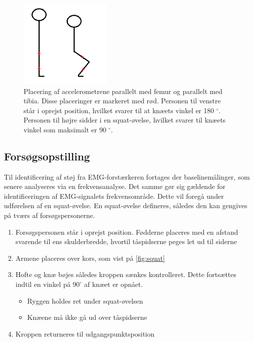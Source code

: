 \begin{figure}[H]
\centering
\includegraphics[width=0.4\textwidth]{figures/accelerometervinkel.png}
\caption{Placering af accelerometrene parallelt med femur og parallelt med tibia. Disse placeringer er markeret med rød. Personen til venstre står i oprejst position, hvilket svarer til at knæets vinkel er 180 $^{\circ}$. Personen til højre sidder i en squat-øvelse, hvilket svarer til knæets vinkel som maksimalt er 90 $^{\circ}$.}
\label{fig:accelerometervinkel}
\end{figure}

\subsection{Forsøgsopstilling}
Til identificering af støj fra EMG-forstærkeren fortages der baselinemålinger, som senere analyseres via en frekvensanalyse. Det samme gør sig gældende for identificeringen af EMG-signalets frekvensområde. Dette vil foregå under udførelsen af en squat-øvelse.
En squat-øvelse defineres, således den kan gengives på tværs af forsøgspersonerne.\vspace{3mm}
\begin{enumerate}
\item Forsøgspersonen står i oprejst position. Fødderne placeres med en afstand svarende til ens skulderbredde, hvortil tåspidserne peges let ud til siderne
\item Armene placeres over kors, som vist på \autoref{fig:squat}
\item Hofte og knæ bøjes således kroppen sænkes kontrolleret. Dette fortsættes indtil en vinkel på $90^{\circ}$ af knæet er opnået.
	\begin{itemize}
	\item Ryggen holdes ret under squat-øvelsen 
	\item Knæene må ikke gå ud over tåspidserne 
	\end{itemize}
\item Kroppen returneres til udgangspunktsposition
\end{enumerate} \vspace{3mm}


